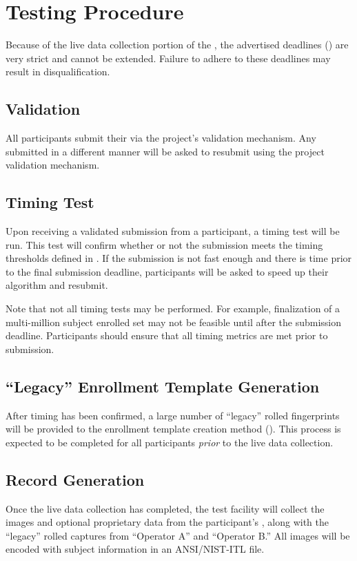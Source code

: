\section{Testing Procedure}
\label{sec:procedure}

Because of the live data collection portion of the \project, the advertised
deadlines () are very strict and cannot be
extended. Failure to adhere to these deadlines may result in disqualification.

\subsection{Validation}

All participants submit their \lib via the project's validation mechanism. Any
\lib submitted in a different manner will be asked to resubmit using the project
validation mechanism.

\subsection{Timing Test}
Upon receiving a validated submission from a participant, a timing test will be
run. This test will confirm whether or not the submission meets the timing
thresholds defined in . If the submission is not
fast enough and there is time prior to the final submission deadline,
participants will be asked to speed up their algorithm and resubmit.

Note that not all timing tests may be performed. For example, finalization of
a multi-million subject enrolled set may not be feasible until after the submission
deadline. Participants should ensure that all timing metrics are met prior to
submission.

\subsection{``Legacy'' Enrollment Template Generation}
After timing has been confirmed, a large number of ``legacy'' rolled
fingerprints will be provided to the enrollment template creation method
(). This process is expected to be completed
for all participants \textit{prior} to the live data collection.

\subsection{Record Generation}
Once the live data collection has completed, the test facility will collect the
images and optional proprietary data from the participant's \scanners, along
with the ``legacy'' rolled captures from ``Operator A'' and ``Operator B.'' All
images will be encoded with subject information in an ANSI/NIST-ITL file.

